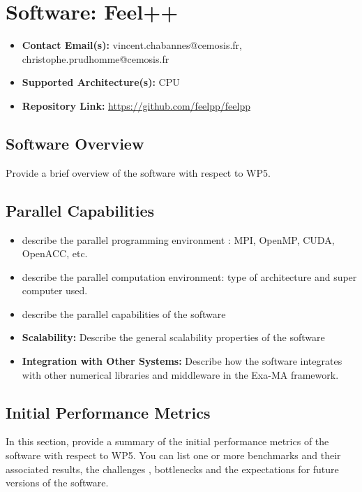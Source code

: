 \section{Software: Feel++}
\label{sec:WP5:Feel++:software}

\begin{itemize}
    \item \textbf{Contact Email(s):} vincent.chabannes@cemosis.fr, christophe.prudhomme@cemosis.fr
    \item \textbf{Supported Architecture(s):} CPU
    \item \textbf{Repository Link:} \href{https://github.com/feelpp/feelpp}{https://github.com/feelpp/feelpp}
\end{itemize}

\subsection{Software Overview}
\label{sec:WP5:Feel++:summary}

Provide a brief overview of the software with respect to WP5.

\subsection{Parallel Capabilities}
\label{sec:WP5:Feel++:performances}


\begin{itemize}
    \item describe the parallel programming  environment : MPI, OpenMP, CUDA, OpenACC, etc.
    \item describe the parallel computation environment: type of architecture and super computer used.
    \item describe the parallel capabilities of the software
    \item \textbf{Scalability:} Describe the general scalability properties of the software
    \item \textbf{Integration with Other Systems:} Describe how the software integrates with other numerical libraries and middleware in the Exa-MA framework.
\end{itemize}

\subsection{Initial Performance Metrics}
\label{sec:WP5:Feel++:metrics}

In this section, provide a summary of the initial performance metrics of the software with respect to WP5.
You can list one or more benchmarks and their associated results, the challenges , bottlenecks and the expectations for future versions of the software.



